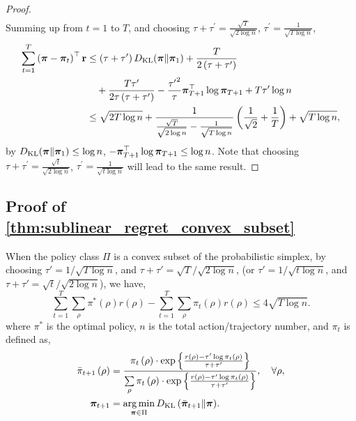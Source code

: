 \begin{proof}
\begin{equation*}
\begin{split}
\end{split}
\end{equation*}
Summing up from $t = 1$ to $T$, and choosing $\tau + \tau^\prime = \frac{\sqrt{T}}{\sqrt{2 \log{n}}}$, $\tau^\prime = \frac{1}{\sqrt{T \log{n}}}$,
\begin{equation*}
\begin{split}
    \sum\limits_{t=1}^{T}{\left( {\boldsymbol{\pi}} - {\boldsymbol{\pi}}_t \right)^\top {\mathbf{r}} } &\le \left(\tau + \tau^\prime\right) D_{\mathrm{KL}}{\left( {\boldsymbol{\pi}} \middle\| {\boldsymbol{\pi}}_1 \right)} + \frac{T}{2\left(\tau + \tau^\prime\right)} \\
    &\quad + \frac{T \tau^\prime}{2\tau \left(\tau + \tau^\prime\right)} - \frac{{\tau^\prime}^2}{\tau} {\boldsymbol{\pi}}_{T+1}^\top \log{{\boldsymbol{\pi}}_{T+1}} + T \tau^\prime \log{n} \\
    &\le \sqrt{2T \log{n}} + \frac{1}{\frac{\sqrt{T}}{\sqrt{2 \log{n}}} - \frac{1}{\sqrt{T\log{n}}}} \left( \frac{1}{\sqrt{2}}+ \frac{1}{T} \right) + \sqrt{T \log{n}},
\end{split}
\end{equation*}
by $D_{\mathrm{KL}}{\left( {\boldsymbol{\pi}} \middle\| {\boldsymbol{\pi}}_1 \right)} \le \log{n}$, $ - {\boldsymbol{\pi}}_{T+1}^\top \log{{\boldsymbol{\pi}}_{T+1}} \le \log{n}$. Note that choosing $\tau + \tau^\prime = \frac{\sqrt{t}}{\sqrt{2 \log{n}}}$, $\tau^\prime = \frac{1}{\sqrt{t \log{n}}}$ will lead to the same result.
\end{proof}

\subsection{Proof of \cref{thm:sublinear_regret_convex_subset}}

\begin{thm}
\label{thm:sublinear_regret_convex_subset}
When the policy class $\Pi$ is a convex subset of the probabilistic simplex, by choosing $\tau'=1/\sqrt{T\log{n}}$, and $\tau + \tau' = \sqrt{T} / \sqrt{2\log n}$, (or $\tau'=1/\sqrt{t\log{n}}$, and $\tau + \tau' = \sqrt{t} / \sqrt{2\log n}$), we have,
\begin{equation*}
    \sum\limits_{t=1}^{T}{ \sum\limits_{\rho}{ \pi^*(\rho) r(\rho)}} - \sum\limits_{t=1}^{T}{ \sum\limits_{\rho}{ \pi_t(\rho) r(\rho)}} \le 4\sqrt{T\log n}.
\end{equation*}
where $\pi^*$ is the optimal policy, $n$ is the total action/trajectory number, and $\pi_{t}$ is defined as,
\begin{align*}
    \bar{\pi}_{t+1}\left( \rho \right) &= \frac{\pi_t\left( \rho \right) \cdot \exp\left\{ \frac{r\left( \rho \right) - \tau^\prime \log{\pi_t\left( \rho \right)}}{\tau + \tau^\prime} \right\}}{ \sum\limits_{\rho}{ \pi_t\left( \rho \right) \cdot \exp\left\{ \frac{r\left( \rho \right) - \tau^\prime \log{\pi_t\left( \rho \right)}}{\tau + \tau^\prime} \right\} } }, \quad \forall \rho, \\
    {\boldsymbol{\pi}}_{t+1} &= \operatorname*{arg\,min}\limits_{{\boldsymbol{\pi}} \in \Pi}{ D_{\mathrm{KL}}\left( \bar{{\boldsymbol{\pi}}}_{t+1} \middle\| {\boldsymbol{\pi}} \right) }.
\end{align*}
\end{thm}

